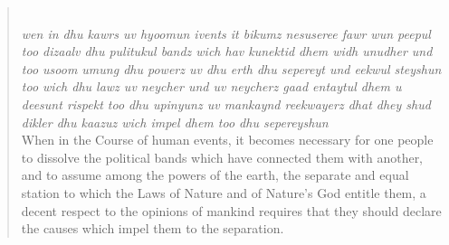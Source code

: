 \begin{quote}\noindent {}\\[1pt]
\textit{wen in dhu kawrs uv hyoomun ivents it bikumz nesuseree fawr wun peepul too dizaalv dhu pulitukul bandz wich hav kunektid dhem widh unudher und too usoom umung dhu powerz uv dhu erth dhu sepereyt und eekwul steyshun too wich dhu lawz uv neycher und uv neycherz gaad entaytul dhem u deesunt rispekt too dhu upinyunz uv mankaynd reekwayerz dhat dhey shud dikler dhu kaazuz wich impel dhem too dhu sepereyshun}\\[1pt]
When in the Course of human events, it becomes necessary for one people to dissolve the political bands which have connected them with another, and to assume among the powers of the earth, the separate and equal station to which the Laws of Nature and of Nature's God entitle them, a decent respect to the opinions of mankind requires that they should declare the causes which impel them to the separation.
\end{quote}